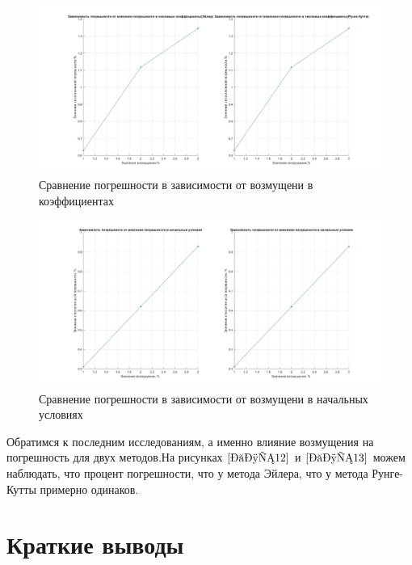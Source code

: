 \documentclass[a4paper]{article}
\begin{document}
\begin{figure}[h!]
\begin{center}
\includegraphics[scale=0.3]{сравнение возмущение коэф.jpg} 
\end{center}
\caption{Сравнение погрешности в зависимости от возмущени в коэффициентах} \label{Рис12}
\end{figure}

\begin{figure}[h!]
\begin{center}
\includegraphics[scale=0.3]{сравнение возмущение нач усл.jpg} 
\end{center}
\caption{Сравнение погрешности в зависимости от возмущени в начальных условиях} \label{Рис13}
\end{figure}
Обратимся к последним исследованиям, а именно влияние возмущения на погрешность для двух методов.На рисунках $\ref{Рис12}$ и $\ref{Рис13}$ можем наблюдать, что процент погрешности, что у метода Эйлера, что у метода Рунге-Кутты примерно одинаков. 



\newpage
\section{Краткие выводы} 
\end{document}

